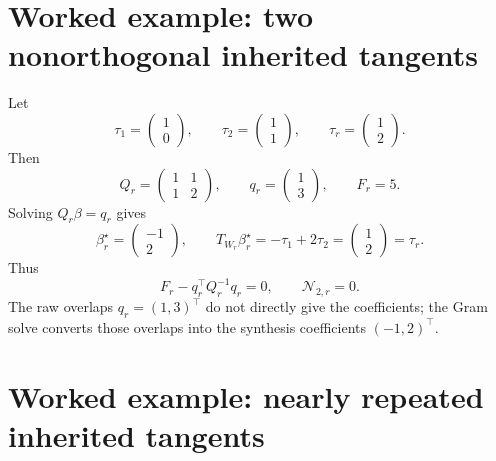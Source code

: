 \documentclass[10pt,twocolumn]{article}
\newcommand{\nov}{\mathcal N}
\begin{document}
\section{Worked example: two nonorthogonal inherited tangents}

Let
\begin{equation}
\tau_1=\begin{pmatrix}1\\0\end{pmatrix},
\qquad
\tau_2=\begin{pmatrix}1\\1\end{pmatrix},
\qquad
\tau_r=\begin{pmatrix}1\\2\end{pmatrix}.
\end{equation}
Then
\begin{equation}
Q_r=
\begin{pmatrix}1&1\\1&2\end{pmatrix},
\qquad
q_r=
\begin{pmatrix}1\\3\end{pmatrix},
\qquad
F_r=5.
\end{equation}
Solving \(Q_r\beta=q_r\) gives
\begin{equation}
\beta_r^\star=
\begin{pmatrix}-1\\2\end{pmatrix},
\qquad
T_{W_r}\beta_r^\star
=-\tau_1+2\tau_2
=\begin{pmatrix}1\\2\end{pmatrix}
=\tau_r.
\end{equation}
Thus
\begin{equation}
F_r-q_r^\top Q_r^{-1}q_r=0,
\qquad
\nov_{2,r}=0.
\end{equation}
The raw overlaps \(q_r=(1,3)^\top\) do not directly give the coefficients; the Gram solve converts those overlaps into the synthesis coefficients \((-1,2)^\top\).

\section{Worked example: nearly repeated inherited tangents}
\end{document}
